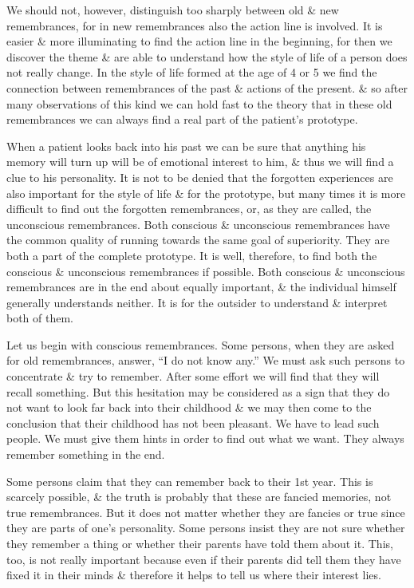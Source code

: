 \documentclass{article}
\begin{document}
We should not, however, distinguish too sharply between old \& new remembrances, for in new remembrances also the action line is involved. It is easier \& more illuminating to find the action line in the beginning, for then we discover the theme \& are able to understand how the style of life of a person does not really change. In the style of life formed at the age of 4 or 5 we find the connection between remembrances of the past \& actions of the present. \& so after many observations of this kind we can hold fast to the theory that in these old remembrances we can always find a real part of the patient's prototype.

When a patient looks back into his past we can be sure that anything his memory will turn up will be of emotional interest to him, \& thus we will find a clue to his personality. It is not to be denied that the forgotten experiences are also important for the style of life \& for the prototype, but many times it is more difficult to find out the forgotten remembrances, or, as they are called, the unconscious remembrances. Both conscious \& unconscious remembrances have the common quality of running towards the same goal of superiority. They are both a part of the complete prototype. It is well, therefore, to find both the conscious \& unconscious remembrances if possible. Both conscious \& unconscious remembrances are in the end about equally important, \& the individual himself generally understands neither. It is for the outsider to understand \& interpret both of them.

Let us begin with conscious remembrances. Some persons, when they are asked for old remembrances, answer, ``I do not know any.'' We must ask such persons to concentrate \& try to remember. After some effort we will find that they will recall something. But this hesitation may be considered as a sign that they do not want to look far back into their childhood \& we may then come to the conclusion that their childhood has not been pleasant. We have to lead such people. We must give them hints in order to find out what we want. They always remember something in the end.

Some persons claim that they can remember back to their 1st year. This is scarcely possible, \& the truth is probably that these are fancied memories, not true remembrances. But it does not matter whether they are fancies or true since they are parts of one's personality. Some persons insist they are not sure whether they remember a thing or whether their parents have told them about it. This, too, is not really important because even if their parents did tell them they have fixed it in their minds \& therefore it helps to tell us where their interest lies.
\end{document}
